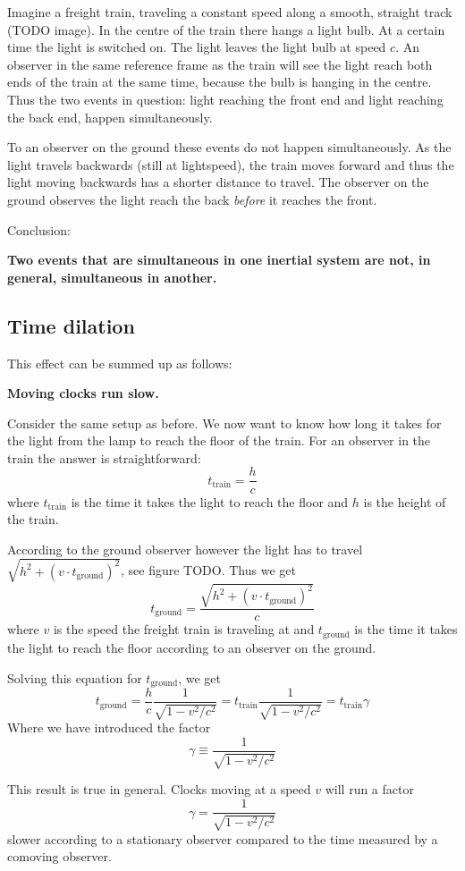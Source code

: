 \begin{example}
Imagine a freight train, traveling a constant speed along a smooth, straight track (TODO image). In the centre of the train there hangs a light bulb. At a certain time the light is switched on. The light leaves the light bulb at speed $c$. An observer in the same reference frame as the train will see the light reach both ends of the train at the same time, because the bulb is hanging in the centre. Thus the two events in question: light reaching the front end and light reaching the back end, happen simultaneously.

To an observer on the ground these events do not happen simultaneously. As the light travels backwards (still at lightspeed), the train moves forward and thus the light moving backwards has a shorter distance to travel. The observer on the ground observes the light reach the back \emph{before} it reaches the front.
\end{example}
Conclusion:

\begin{center}
\textbf{Two events that are simultaneous in one inertial system are not, in general, simultaneous in another.}
\end{center}

\subsection{Time dilation}
This effect can be summed up as follows:

\begin{center}
\textbf{Moving clocks run slow.}
\end{center}

\begin{example}
Consider the same setup as before. We now want to know how long it takes for the light from the lamp to reach the floor of the train. For an observer in the train the answer is straightforward:
\[ t_\text{train} = \frac{h}{c} \]
where $t_\text{train}$ is the time it takes the light to reach the floor and $h$ is the height of the train.

According to the ground observer however the light has to travel $\sqrt{h^2+ (v\cdot t_\text{ground})^2}$, see figure TODO. Thus we get
\[ t_\text{ground} = \frac{\sqrt{h^2+ (v\cdot t_\text{ground})^2}}{c} \]
where $v$ is the speed the freight train is traveling at and $t_\text{ground}$ is the time it takes the light to reach the floor according to an observer on the ground.

Solving this equation for $t_\text{ground}$, we get
\[ t_\text{ground} = \frac{h}{c}\frac{1}{\sqrt{1-v^2/c^2}} = t_\text{train}\frac{1}{\sqrt{1-v^2/c^2}} = t_\text{train}\gamma \]
Where we have introduced the factor
\[ \gamma \equiv \frac{1}{\sqrt{1-v^2/c^2}} \]
\end{example}
This result is true in general. Clocks moving at a speed $v$ will run a factor
\[\gamma = \frac{1}{\sqrt{1-v^2/c^2}}\]
slower according to a stationary observer compared to the time measured by a comoving observer.

